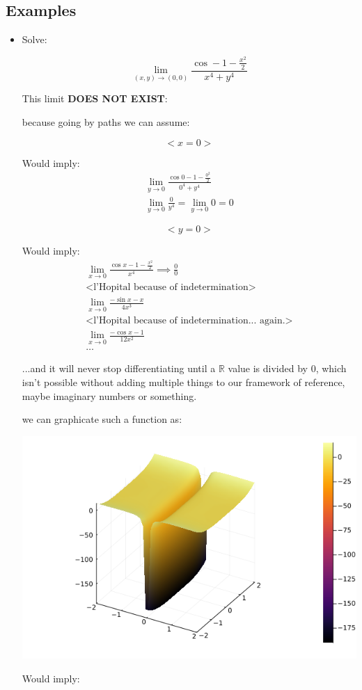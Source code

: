 \documentclass[11pt,fleqn]{book} %
\begin{document}
\subsection{Examples}
\begin{itemize}
    \item Solve:

\begin{equation}
    \lim_{(x,y) \to (0,0)}  \frac{\cos - 1 - \frac{x^2}{2}}{x^4+y^4}
\end{equation}

This limit \textbf{DOES NOT EXIST}:

because going by paths we can assume:

$$<x=0>$$

Would imply:
\begin{gather}
    \lim_{y \to 0} \frac{\cos 0 - 1 - \frac{0^2}{2}}{0^4 + y^4} \\
    \lim_{y \to 0} \frac{0}{y^4} = \lim_{y \to 0} 0 = 0
\end{gather}

$$<y=0>$$

Would imply:
\begin{gather}
    \lim_{x \to 0} \frac{\cos x - 1 - \frac{x^2}{2}}{x^4} \implies \frac{0}{0} \\
    \text{<l'Hopital because of indetermination>}\\
    \lim_{x \to 0} \frac{- \sin x - x}{4x^3} \\
    \text{<l'Hopital because of indetermination... again.>} \\
    \lim_{x \to 0} \frac{- \cos x - 1}{12x^2} \\
    \dots
\end{gather}

...and it will never stop differentiating until a $\mathbb{R}$ value is divided by 0, which
isn't possible without adding multiple things to our framework of reference, maybe imaginary numbers or
something.


we can graphicate such a function as:

\begin{center}
    \includegraphics[scale=0.5]{Pictures/4131.png}    
\end{center}

Would imply:
\end{itemize}
\end{document}
